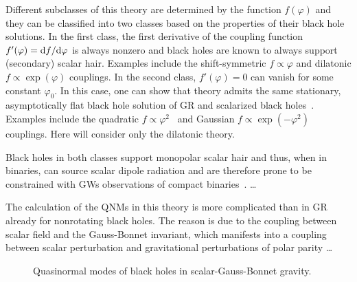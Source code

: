 \documentclass[twocolumn,prd,aps,superscriptaddress,preprintnumbers,tightenlines,showpacs,nofootinbib,eqsecnum,amsfonts,amsmath,longbibliography]{revtex4-1}
\newcommand{\dd}{{\rm d}}
\begin{document}
Different subclasses of this theory are determined by the function $f(\varphi)$
and they can be classified into two classes based on the properties of their black hole solutions.
%
In the first class, the first derivative of the coupling
function $f'(\varphi) = \dd f  / \dd \varphi$ is always nonzero and black holes
are known to always support (secondary) scalar hair.
%
Examples include the shift-symmetric $f \propto \varphi$ and dilatonic
$f \propto \exp(\varphi)$ couplings.
%
In the second class, $f'(\varphi) = 0$ can vanish for some constant $\varphi_0$.
%
In this case, one can show that theory admits the same stationary,
asymptotically flat black hole solution of GR and scalarized black
holes~\cite{Doneva:2017bvd,Silva:2017uqg,Dima:2020yac,Herdeiro:2020wei,Berti:2020kgk}.
%
Examples include the quadratic $f \propto \varphi^2$~\cite{Silva:2017uqg}
and Gaussian $f \propto \exp(-\varphi^2)$~\cite{Doneva:2017bvd} couplings.
%
Here will consider only the dilatonic theory.

Black holes in both classes support monopolar scalar hair and thus, when in binaries,
can source scalar dipole radiation and are therefore prone to be constrained with
GWs observations of compact binaries~\cite{Nair:2019iur,Perkins:2021mhb}.
%
\dots

The calculation of the QNMs in this theory is more complicated than in GR already for
nonrotating black holes. The reason is due to the coupling between scalar field and
the Gauss-Bonnet invariant, which manifests into a coupling between scalar perturbation
and gravitational perturbations of polar parity \dots

\begin{figure}
\caption{Quasinormal modes of black holes in scalar-Gauss-Bonnet gravity.}
\end{figure}
\end{document}
